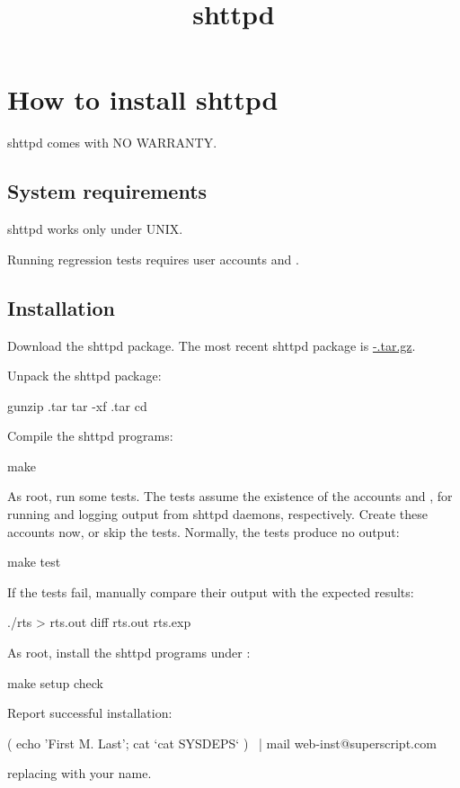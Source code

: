 \documentclass{book}
\title{shttpd}
\begin{document}
\section{How to install shttpd}

shttpd comes with NO WARRANTY.

\subsection{System requirements}
shttpd works only under UNIX.

Running regression tests requires user accounts  and .

\subsection{Installation}
Download the shttpd package.  The most recent shttpd package is
\href{\version}{\package-\version.tar.gz}.

Unpack the shttpd package:
\begin{code}
  gunzip \package.tar
  tar -xf \package.tar
  cd \package
\end{code}

Compile the shttpd programs:
\begin{code}
  make
\end{code}

As root, run some tests.  The tests assume the existence of the
accounts  and , for running and logging
output from shttpd daemons, respectively.  Create these accounts now,
or skip the tests.  Normally, the tests produce no output:
\begin{code}
  make test
\end{code}
If the tests fail, manually compare their output with the expected results:
\begin{code}
  ./rts \string> rts.out
  diff rts.out rts.exp
\end{code}

As root, install the shttpd programs under :
\begin{code}
  make setup check
\end{code}

Report successful installation:
\begin{code}
  ( echo 'First M. Last'; cat `cat SYSDEPS` ) \
  | mail web-inst@superscript.com
\end{code}
replacing  with your name.
\end{document}
